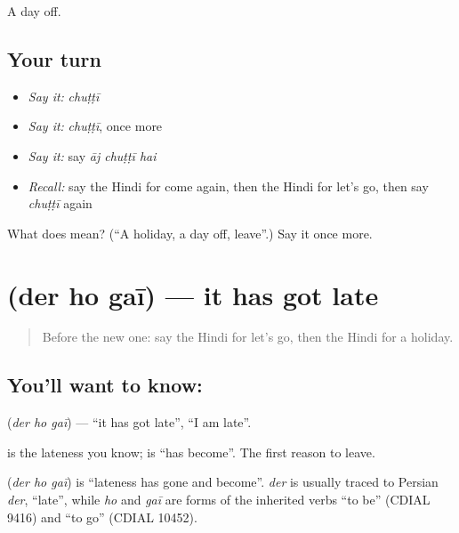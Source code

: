\begin{grammarlens}[title={What you've built}]
A day off.
\end{grammarlens}

\subsection*{Your turn}
\begin{itemize}
\raggedright
  \item \emph{Say it:} \emph{chuṭṭī}
  \item \emph{Say it:} \emph{chuṭṭī}, once more
  \item \emph{Say it:} say \emph{āj chuṭṭī hai}
  \item \emph{Recall:} say the Hindi for come again, then the Hindi for let's go, then say \emph{chuṭṭī} again
\end{itemize}

\begin{tcolorbox}[breakable,colback=teal!4,colframe=teal!35!black,title={Before you move on}]
What does  mean? (\textquotedblleft{}A holiday, a day off, leave\textquotedblright{}.) Say it once more.
\end{tcolorbox}
\section[\texorpdfstring{\hi{देर} \hi{हो} \hi{गई} (der ho gaī)}{देर हो गई (der ho gaī)}]{   (der ho gaī) — it has got late}

\label{lesson:HI-C122-derhogai}



\begin{quote}
Before the new one: say the Hindi for let's go, then the Hindi for a holiday.
\end{quote}

\subsection*{You'll want to know:   }
\textbf{  } (\emph{der ho gaī}) — \textquotedblleft{}it has got late\textquotedblright{}, \textquotedblleft{}I am late\textquotedblright{}.

\textbf{} is the lateness you know; \textbf{ } is \textquotedblleft{}has become\textquotedblright{}. The first reason to leave.

\begin{cousinweb}
\textbf{  } (\emph{der ho gaī}) is \textquotedblleft{}lateness has gone and become\textquotedblright{}. \emph{der} is usually traced to Persian \emph{der}, \textquotedblleft{}late\textquotedblright{}, while \emph{ho} and \emph{gaī} are forms of the inherited verbs \textquotedblleft{}to be\textquotedblright{} (CDIAL 9416) and \textquotedblleft{}to go\textquotedblright{} (CDIAL 10452).
\end{cousinweb}

